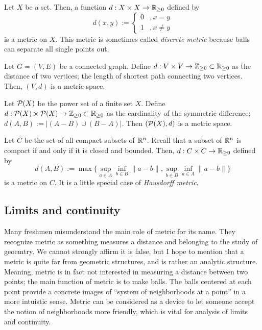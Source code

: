 \documentclass{../crs}
\begin{document}
\begin{ex}\label{ex:discrete metric}
Let $X$ be a set.
Then, a function $d:X\x X\to\R_{\ge0}$ defined by
\[d(x,y):=\begin{cases}0&,x=y\\1&,x\ne y\end{cases}\]
is a metric on $X$.
This metric is sometimes called \emph{discrete metric} because balls can separate all single points out.
\end{ex}
\begin{ex}
Let $G=(V,E)$ be a connected graph.
Define $d:V\x V\to\Z_{\ge0}\subset\R_{\ge0}$ as the distance of two vertices; the length of shortest path connecting two vertices.
Then, $(V,d)$ is a metric space.
\end{ex}
\begin{ex}
Let $\mathcal{P}(X)$ be the power set of a finite set $X$.
Define $d:\cP(X)\x\cP(X)\to\Z_{\ge0}\subset\R_{\ge0}$ as the cardinality of the symmetric difference; $d(A,B):=|(A-B)\cup(B-A)|$.
Then $(\mathcal{P}(X),d)$ is a metric space.
\end{ex}
\begin{ex}
Let $C$ be the set of all compact subsets of $\mathbb{R}^n$.
Recall that a subset of $\mathbb{R}^n$ is compact if and only if it is closed and bounded.
Then, $d:C\x C\to\R_{\ge0}$ defined by
\[d(A,B):=\max\{\sup_{a\in A}\inf_{b\in B}\|a-b\|,\sup_{b\in B}\inf_{a\in A}\|a-b\|\}\]
is a metric on $C$.
It is a little special case of \emph{Hausdorff metric}.
\end{ex}



\subsection{Limits and continuity}

Many freshmen misunderstand the main role of metric for its name.
They recognize metric as something measures a distance and belonging to the study of geoemtry.
We cannot strongly affirm it is false, but I hope to mention that a metric is quite far from geometric structures, and is rather an analytic structure.
Meaning, metric is in fact not interested in measuring a distance between two points; the main function of metric is to make balls.
The balls centered at each point provide a concrete images of ``system of neighborhoods at a point'' in a more intuistic sense.
Metric can be considered as a device to let someone accept the notion of neighborhoods more friendly, which is vital for analysis of limits and continuity.
\end{document}

